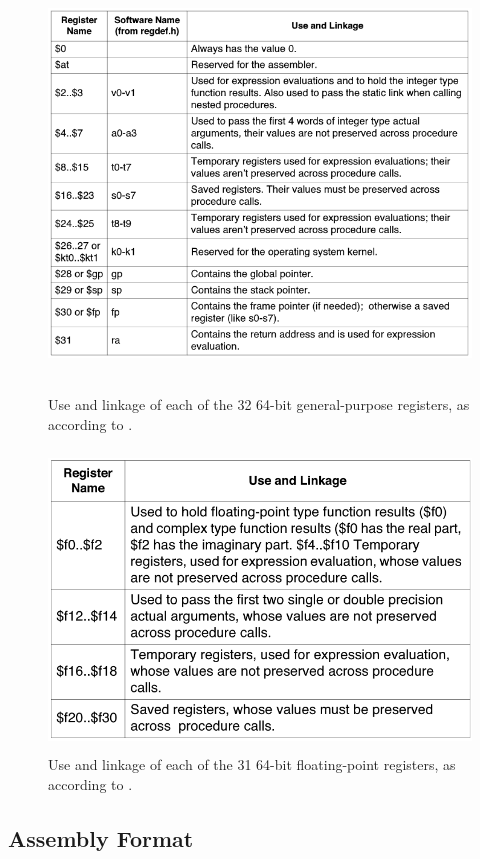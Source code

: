 \documentclass[
    paper=letter,
    parskip=half,
    fontsize=12pt,
    titlepage=firstiscover,
    toc=bibliography,
    numbers=endperiod
]{scrartcl}
\begin{document}
\begin{figure}[H]
    \includegraphics[height=11cm]{gpr-names}
    \caption{Use and linkage of each of the 32 64-bit general-purpose registers, as according to \protect\cite[Table~1-1]{mips-programmers-guide}.}
\end{figure}

\begin{figure}[H]
    \includegraphics[height=8cm]{fpr-names}
    \caption{Use and linkage of each of the 31 64-bit floating-point
        registers, as according to \protect\cite[Table~1-3]{mips-programmers-guide}.}
\end{figure}

\subsection{Assembly Format}
\end{document}
